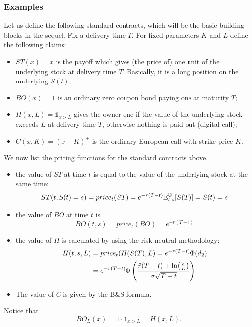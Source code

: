 \subsubsection{Examples}
Let us define the following standard contracts, which will be the basic building blocks in the sequel. Fix a delivery time $T$. For fixed parameters $K$ and $L$ define the following claims:
\begin{itemize}
    \item $ST(x) = x$ is the payoff which gives (the price of) one unit of the underlying stock at delivery time $T$. Basically, it is a long position on the underlying $S(t)$;
    \item $BO(x) = 1$ is an ordinary zero coupon bond paying one at maturity $T$;
    \item $H(x,L) = \mathds{1}_{x>L}$ gives the owner one if the value of the underlying stock exceeds $L$ at delivery time $T$, otherwise nothing is paid out (digital call);
    \item $C(x,K) = (x-K)^+$ is the ordinary European call with strike price $K$.
\end{itemize}
We now list the pricing functions for the standard contracts above.
\begin{itemize}
    \item the value of $ST$ at time $t$ is equal to the value of the
    underlying stock at the same time:
    \begin{equation}
        ST(t,S(t)=s) = price_t(ST) = e^{-r(T-t)}\mathbb{E}^{\mathbb{Q}}_{t,s}[S(T)] = S(t) = s
    \end{equation}
    \item the value of $BO$ at time $t$ is
    \begin{equation}
        BO(t,s) = price_t(BO) = e^{-r(T-t)}
    \end{equation}
    \item the value of $H$ is calculated by using the risk neutral methodology:
    \begin{align}
        \notag H(t,s,L) &= price_t(H(S(T),L) = e^{-r(T-t)}\Phi(d_2) \\
        &=
        e^{-r(T-t)}\Phi\left(\frac{\Tilde{r}(T-t) + \ln(\tfrac{s}{L})}{\sigma\sqrt{T-t}}\right)
    \end{align}
    \item The value of $C$ is given by the B\&S formula.
\end{itemize}
Notice that
$$BO_L(x) = 1\cdot\mathds{1}_{x>L} = H(x,L).$$
